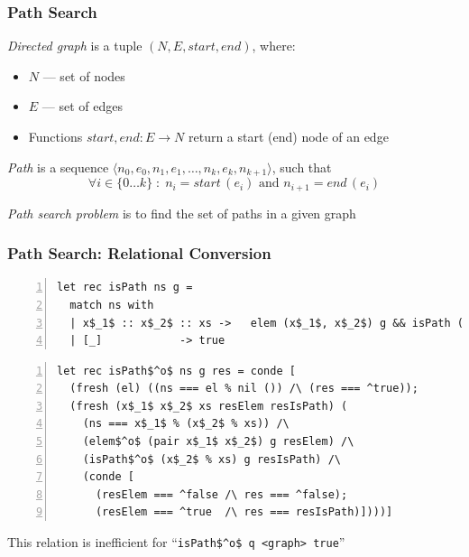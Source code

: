 \documentclass[xcolor=table]{beamer}
\begin{document}
\begin{frame}[fragile]
  \transwipe[direction=90]
  \frametitle{Path Search}

\emph{Directed graph} is a tuple $(N, E, start, end)$, where: 

\begin{itemize}
	\item $N$ --- set of nodes
	\item $E$ --- set of edges
	\item Functions $start, end: E \rightarrow N$ return a start (end) node of an edge
\end{itemize} 

\pause
\vspace{10pt}

\emph{Path} is a sequence $\langle n_0, e_0, n_1, e_1, \dots, n_k, e_k, n_{k+1} \rangle$, such that 
\[
\forall i \in \{ 0 \dots k \}\; :\; n_i = start\,(e_i) \text{ and } n_{i+1} = end\,(e_i)
\]

\vspace{10pt}

\pause
\emph{Path search problem} is to find the set of paths in a given graph

\end{frame}

\begin{frame}[fragile]
  \transwipe[direction=90]
  \frametitle{Path Search: Relational Conversion }

\begin{lstlisting}[numbers=left,numberstyle=\small]
let rec isPath ns g =
  match ns with
  | x$_1$ :: x$_2$ :: xs ->   elem (x$_1$, x$_2$) g && isPath (x$_2$ :: xs) g 
  | [_]            -> true
\end{lstlisting}

\pause

\begin{lstlisting}[numbers=left,numberstyle=\small]
let rec isPath$^o$ ns g res = conde [
  (fresh (el) ((ns === el % nil ()) /\ (res === ^true));
  (fresh (x$_1$ x$_2$ xs resElem resIsPath) (
    (ns === x$_1$ % (x$_2$ % xs)) /\ 
    (elem$^o$ (pair x$_1$ x$_2$) g resElem) /\
    (isPath$^o$ (x$_2$ % xs) g resIsPath) /\ 
    (conde [
      (resElem === ^false /\ res === ^false); 
      (resElem === ^true  /\ res === resIsPath)])))]
\end{lstlisting}

This relation is inefficient for ``\lstinline{isPath$^o$ q <graph> true}''

\end{frame}
\end{document}
